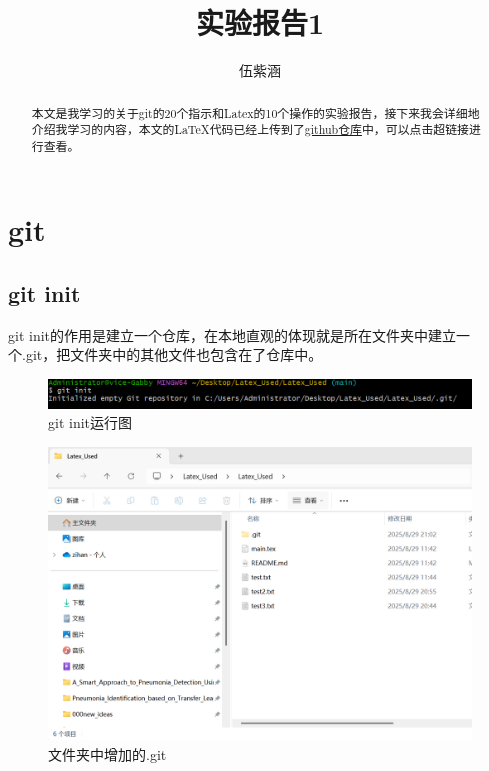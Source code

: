 \documentclass{article}
\title{实验报告1}
\author{伍紫涵}
\begin{document}
\maketitle

\begin{abstract}
本文是我学习的关于git的20个指示和Latex的10个操作的实验报告，接下来我会详细地介绍我学习的内容，本文的LaTeX代码已经上传到了\href{https://github.com/qiqiqisi/Latex_Used.git}{github仓库}中，可以点击超链接进行查看。
\end{abstract}


{\hypersetup{hidelinks}\tableofcontents}

\section{git}
\subsection{git init}
git init的作用是建立一个仓库，在本地直观的体现就是所在文件夹中建立一个.git，把文件夹中的其他文件也包含在了仓库中。
\begin{figure}[H]
    \centering
    \includegraphics[width=1\linewidth]{git_init_code.png}
    \caption{git init运行图}
    \label{fig:init}
\end{figure}

\begin{figure}[H]
    \centering
    \includegraphics[width=1\linewidth]{git_init_show.png}
    \caption{文件夹中增加的.git}
    \label{fig:init1}
\end{figure}
\end{document}
